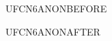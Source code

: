 \documentclass{abntexto-ufc}
\begin{document}
UFCN6ANONBEFORE\par
\imprimircapa
UFCN6ANONAFTER\par
\end{document}
